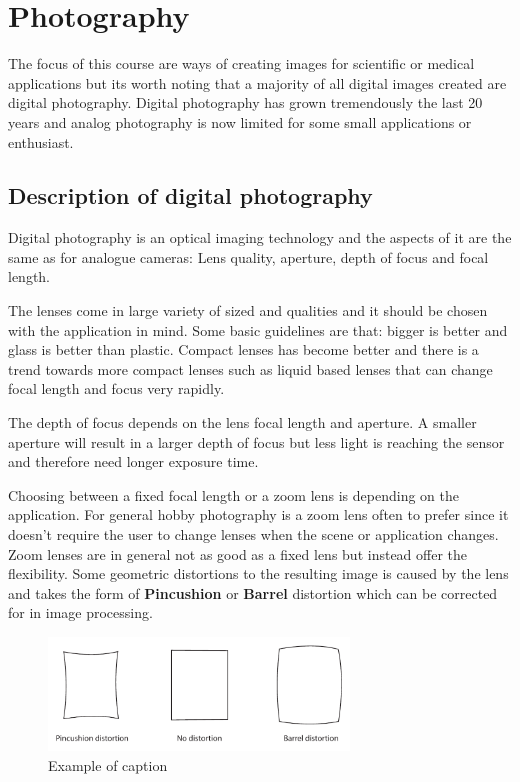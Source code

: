 \section{Photography}
The focus of this course are ways of creating images for scientific or medical applications but its worth noting that a majority of all digital images created are digital photography. Digital photography has grown tremendously the last 20 years and analog photography is now limited for some small applications or enthusiast. 

\subsection*{Description of digital photography}
Digital photography is an optical imaging technology and the aspects of it are the same as for analogue cameras: Lens quality, aperture, depth of focus and focal length. 

The lenses come in large variety of sized and qualities and it should be chosen with the application in mind. Some basic guidelines are that: bigger is better and glass is better than plastic. Compact lenses has become better and there is a trend towards more compact lenses such as liquid based lenses that can change focal length and focus very rapidly. 

The depth of focus depends on the lens focal length and aperture. A smaller aperture will result in a larger depth of focus but less light is reaching the sensor and therefore need longer exposure time. 

Choosing between a fixed focal length or a zoom lens is depending on the application. For general hobby photography is a zoom lens often to prefer since it doesn't require the user to change lenses when the scene or application changes. Zoom lenses are in general not as good as a fixed lens but instead offer the flexibility. Some geometric distortions to the resulting image is caused by the lens and takes the form of \textbf{Pincushion} or \textbf{Barrel} distortion which can be corrected for in image processing. 

\begin{figure}[ht!]
\centering
\includegraphics[width=80mm]{figures/distortion.pdf}
\caption{Example of caption}
\label{fig:example}
\end{figure}


